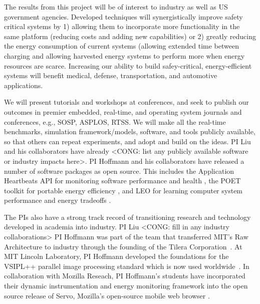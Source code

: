 
The results from this project will be of interest to industry as well
as US government agencies.  Developed techniques will synergistically
improve safety critical systems by 1) allowing them to incorporate
more functionality in the same platform (reducing costs and adding new
capabilities) or 2) greatly reducing the energy consumption of current
systems (allowing extended time between charging and allowing
harvested energy systems to perform more when energy resources are
scarce.  Increasing our ability to build safey-critical,
energy-efficient systems will benefit medical, defense,
transportation, and automotive applications.  

We will present tutorials and workshops at conferences, and seek to
publish our outcomes in premier embedded, real-time, and operating
system journals and conferences, e.g., SOSP, ASPLOS, RTSS.  We will
make all the real-time benchmarks, simulation framework/models,
software, and tools publicly available, so that others can repeat
experiments, and adopt and build on the ideas.  PI Liu and his
collaborators have already <CONG: list any publicly available software
or industry impacts here>.  PI Hoffmann and his collaborators have
released a number of software packages as open source.  This includes
the Application Heartbeats API for monitoring software performance and
health \cite{heartbeats,heartbeatsweb}, the POET toolkit for portable
energy efficiency \cite{POET,poetweb}, and LEO for learning computer
system performance and energy tradeoffs \cite{LEO,leoweb}.

The PIs also have a strong track record of transitioning research and
technology developed in academia into industry.  PI Liu <CONG: fill in
any industry collaborations> PI Hoffmann was part of the team that
transferred MIT's Raw Architecture to industry through the founding of
the Tilera Corporation~\cite{RSP,TILE}.  At MIT Lincoln Laboratory, PI
Hoffmann developed the foundations for the VSIPL++ parallel image
processing standard which is now used worldwide~\cite{VSIPL++}.  In
collaboration with Mozilla Reseach, PI Hoffmann's students have
incorporated their dynamic instrumentation and energy monitoring
framework into the open source release of Servo, Mozilla's open-source
mobile web browser \cite{}.


